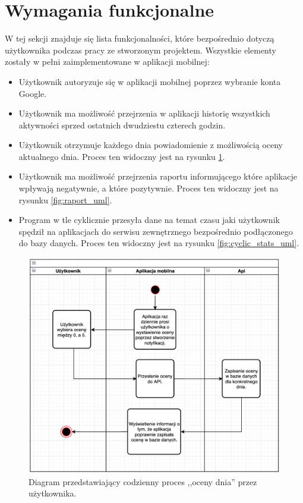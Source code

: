 \documentclass[a4paper,twoside,12pt]{book}
\begin{document}
\section{Wymagania funkcjonalne}
W tej sekcji znajduje się lista funkcjonalności, które bezpośrednio dotyczą użytkownika podczas pracy ze stworzonym projektem. Wszystkie elementy zostały w pełni zaimplementowane w aplikacji mobilnej:
\begin{itemize}
  \item Użytkownik autoryzuje się w aplikacji mobilnej poprzez wybranie konta Google.
  \item Użytkownik ma możliwość przejrzenia w aplikacji historię wszystkich aktywności sprzed ostatnich dwudziestu czterech godzin.
  \item Użytkownik otrzymuje każdego dnia powiadomienie z możliwością oceny aktualnego dnia. Proces ten widoczny jest na rysunku \ref{fig:rate_uml}.
  \item Użytkownik ma możliwość przejrzenia raportu informującego które aplikacje wpływają negatywnie, a które pozytywnie. Proces ten widoczny jest na rysunku \ref{fig:raport_uml}. 
  \item Program w tle cyklicznie przesyła dane na temat czasu jaki użytkownik spędził na aplikacjach do serwisu zewnętrznego bezpośrednio podłączonego do bazy danych. Proces ten widoczny jest na rysunku \ref{fig:cyclic_stats_uml}.
\end{itemize}

\begin{figure}[!htbp]
    \centering
    \includegraphics[scale=0.42]{images/rate_uml.png}
    \caption{Diagram przedstawiający codzienny proces ,,oceny dnia'' przez użytkownika.}
    \label{fig:rate_uml}
\end{figure}
\end{document}

